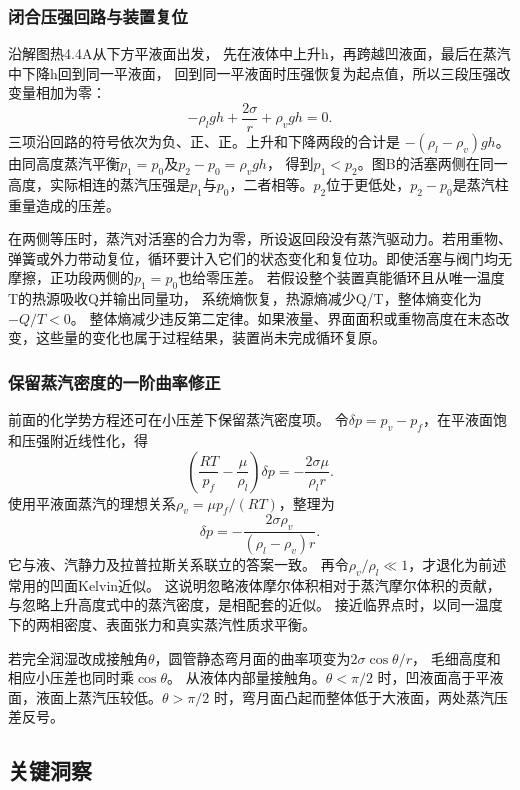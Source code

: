\documentclass[UTF8,fontset=fandol,a4paper,11pt]{ctexart}
\begin{document}
\subsubsection*{闭合压强回路与装置复位}
沿解图热4.4A从下方平液面出发，
先在液体中上升h，再跨越凹液面，最后在蒸汽中下降h回到同一平液面，
回到同一平液面时压强恢复为起点值，所以三段压强改变量相加为零：
\[
-\rho_lgh+\frac{2\sigma}{r}+\rho_vgh=0.
\]
三项沿回路的符号依次为负、正、正。上升和下降两段的合计是 $-(\rho_l-\rho_v)gh$。
由同高度蒸汽平衡$p_1=p_0$及$p_2-p_0=\rho_vgh$，
得到$p_1<p_2$。图B的活塞两侧在同一高度，实际相连的蒸汽压强是$p_1$与$p_0$，二者相等。$p_2$位于更低处，$p_2-p_0$是蒸汽柱重量造成的压差。

在两侧等压时，蒸汽对活塞的合力为零，所设返回段没有蒸汽驱动力。若用重物、弹簧或外力带动复位，循环要计入它们的状态变化和复位功。即使活塞与阀门均无摩擦，正功段两侧的$p_1=p_0$也给零压差。
若假设整个装置真能循环且从唯一温度T的热源吸收Q并输出同量功，
系统熵恢复，热源熵减少Q/T，整体熵变化为$-Q/T<0$。
整体熵减少违反第二定律。如果液量、界面面积或重物高度在末态改变，这些量的变化也属于过程结果，装置尚未完成循环复原。

\subsubsection*{保留蒸汽密度的一阶曲率修正}
前面的化学势方程还可在小压差下保留蒸汽密度项。
令$\delta p=p_v-p_f$，在平液面饱和压强附近线性化，得
\[
\left(\frac{RT}{p_f}-\frac{\mu}{\rho_l}\right)\delta p
=-\frac{2\sigma\mu}{\rho_lr}.
\]
使用平液面蒸汽的理想关系$\rho_v=\mu p_f/(RT)$，整理为
\[
\delta p=-\frac{2\sigma\rho_v}{(\rho_l-\rho_v)r}.
\]
它与液、汽静力及拉普拉斯关系联立的答案一致。
再令$\rho_v/\rho_l\ll1$，才退化为前述常用的凹面Kelvin近似。
这说明忽略液体摩尔体积相对于蒸汽摩尔体积的贡献，与忽略上升高度式中的蒸汽密度，是相配套的近似。
接近临界点时，以同一温度下的两相密度、表面张力和真实蒸汽性质求平衡。

若完全润湿改成接触角$\theta$，圆管静态弯月面的曲率项变为$2\sigma\cos\theta/r$，
毛细高度和相应小压差也同时乘$\cos\theta$。
从液体内部量接触角。$\theta<\pi/2$ 时，凹液面高于平液面，液面上蒸汽压较低。$\theta>\pi/2$ 时，弯月面凸起而整体低于大液面，两处蒸汽压差反号。




\subsection*{关键洞察}
\end{document}
